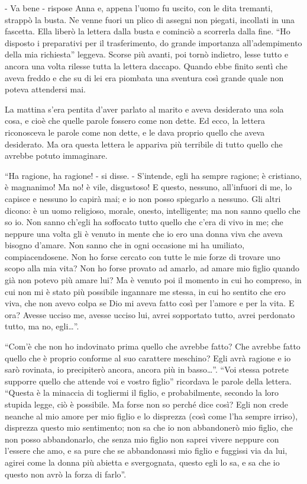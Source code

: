 - Va bene - rispose Anna e, appena l'uomo fu uscito, con le dita tremanti, strappò la busta. Ne venne fuori un plico di assegni non piegati, incollati in una fascetta. Ella liberò la lettera dalla busta e cominciò a scorrerla dalla fine. ``Ho disposto i preparativi per il trasferimento, do grande importanza all'adempimento della mia richiesta'' leggeva. Scorse più avanti, poi tornò indietro, lesse tutto e ancora una volta rilesse tutta la lettera daccapo. Quando ebbe finito sentì che aveva freddo e che su di lei era piombata una sventura così grande quale non poteva attendersi mai. 

La mattina s'era pentita d'aver parlato al marito e aveva desiderato una sola cosa, e cioè che quelle parole fossero come non dette. Ed ecco, la lettera riconosceva le parole come non dette, e le dava proprio quello che aveva desiderato. Ma ora questa lettera le appariva più terribile di tutto quello che avrebbe potuto immaginare. 

``Ha ragione, ha ragione! - si disse. - S'intende, egli ha sempre ragione; è cristiano, è magnanimo! Ma no! è vile, disgustoso! E questo, nessuno, all'infuori di me, lo capisce e nessuno lo capirà mai; e io non posso spiegarlo a nessuno. Gli altri dicono: è un uomo religioso, morale, onesto, intelligente; ma non sanno quello che so io. Non sanno ch'egli ha soffocato tutto quello che c'era di vivo in me; che neppure una volta gli è venuto in mente che io ero una donna viva che aveva bisogno d'amare. Non sanno che in ogni occasione mi ha umiliato, compiacendosene. Non ho forse cercato con tutte le mie forze di trovare uno scopo alla mia vita? Non ho forse provato ad amarlo, ad amare mio figlio quando già non potevo più amare lui? Ma è venuto poi il momento in cui ho compreso, in cui non mi è stato più possibile ingannare me stessa, in cui ho sentito che ero viva, che non avevo colpa se Dio mi aveva fatto così per l'amore e per la vita. E ora? Avesse ucciso me, avesse ucciso lui, avrei sopportato tutto, avrei perdonato tutto, ma no, egli\ldots{}''. 

``Com'è che non ho indovinato prima quello che avrebbe fatto? Che avrebbe fatto quello che è proprio conforme al suo carattere meschino? Egli avrà ragione e io sarò rovinata, io precipiterò ancora, ancora più in basso\ldots{}''. ``Voi stessa potrete supporre quello che attende voi e vostro figlio'' ricordava le parole della lettera. ``Questa è la minaccia di togliermi il figlio, e probabilmente, secondo la loro stupida legge, ciò è possibile. Ma forse non so perché dice così? Egli non crede neanche al mio amore per mio figlio e lo disprezza (così come l'ha sempre irriso), disprezza questo mio sentimento; non sa che io non abbandonerò mio figlio, che non posso abbandonarlo, che senza mio figlio non saprei vivere neppure con l'essere che amo, e sa pure che se abbandonassi mio figlio e fuggissi via da lui, agirei come la donna più abietta e svergognata, questo egli lo sa, e sa che io questo non avrò la forza di farlo''. 

